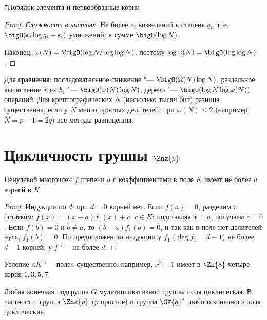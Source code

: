 \begin{lecture}{7}{Порядок элемента и первообразные корни}
\begin{proof}
\emph{Сложность в листьях.} Не более $e_i$ возведений в степень $q_i$, т.\,е.
$\bigO(e_i \log q_i + e_i)$ умножений; в сумме $\bigO(\log N)$.

Наконец, $\omega(N) = \bigO(\log N / \log\log N)$, поэтому $\log \omega(N) = \bigO(\log\log N)$.
\end{proof}

Для сравнения: последовательное снижение "--- $\bigO(\Omega(N) \log N)$, раздельное
вычисление всех $h_i$ "--- $\bigO(\omega(N) \log N)$, дерево "--- $\bigO(\log N \log \omega(N))$
операций. Для криптографических $N$ (несколько тысяч бит) разница существенна, если у $N$ много
простых делителей; при $\omega(N) \le 2$ (например, $N = p - 1 = 2q$) все методы равноценны.




\section{Цикличность группы \texorpdfstring{$\Znx{p}$}{(Z/pZ)*}}

\begin{lemma}\label{l7:roots}
Ненулевой многочлен $f$ степени $d$ с коэффициентами в поле $K$ имеет не более $d$ корней в $K$.
\end{lemma}

\begin{proof}
Индукция по $d$; при $d = 0$ корней нет. Если $f(a) = 0$, разделим с остатком:
$f(x) = (x - a) f_1(x) + c$, $c \in K$; подставляя $x = a$, получаем $c = 0$. Если $f(b) = 0$ и
$b \ne a$, то $(b - a) f_1(b) = 0$, и так как в поле нет делителей нуля, $f_1(b) = 0$. По
предположению индукции у $f_1$ ($\deg f_1 = d - 1$) не более $d - 1$ корней, у $f$ "--- не
более $d$.
\end{proof}

Условие «$K$ "--- поле» существенно: например, $x^2 - 1$ имеет в $\Zn{8}$ четыре корня
$1, 3, 5, 7$.

\begin{theorem}\label{l7:cyclic}
Любая конечная подгруппа $G$ мультипликативной группы поля циклическая. В частности, группа
$\Znx{p}$ ($p$ простое) и группа $\GF{q}^*$ любого конечного поля циклические.
\end{theorem}


\end{lecture}
